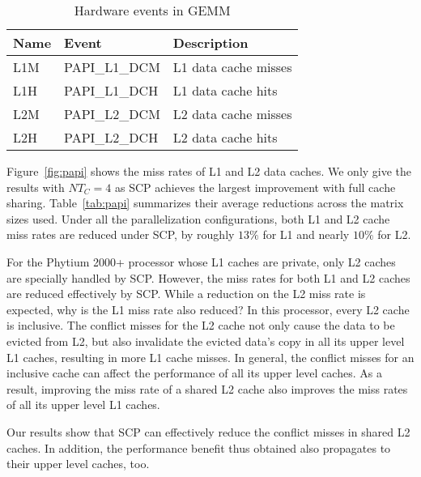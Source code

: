 \begin{table}
  \centering
  \caption{Hardware events in GEMM}
  \label{tab:events}
  \begin{tabular}{lll}
    \toprule
    Name & Event & Description \\
    \midrule
    L1M & PAPI\_L1\_DCM & L1 data cache misses \\
    L1H & PAPI\_L1\_DCH & L1 data cache hits \\
    L2M & PAPI\_L2\_DCM & L2 data cache misses \\
    L2H & PAPI\_L2\_DCH & L2 data cache hits \\
    \bottomrule
  \end{tabular}
\end{table}

Figure~\ref{fig:papi} shows the miss rates of L1 and L2 data caches.
We only give the results with $NT_C=4$
as SCP achieves the largest improvement with full cache sharing.
Table~\ref{tab:papi} summarizes their
average reductions across the matrix sizes used.
Under all the parallelization configurations,
both L1 and L2 cache miss rates are reduced under SCP, 
by roughly $13\%$ for L1 and nearly $10\%$ for L2.

For the Phytium 2000+ processor whose L1 caches are private,
only L2 caches are specially handled by SCP.
However,
the miss rates for both L1 and L2 caches
are reduced effectively by SCP.
While a reduction on the L2 miss rate is expected,
why is the L1 miss rate also reduced? In this processor,
every L2 cache is inclusive.
The conflict misses for the L2 cache not only cause
the data to be evicted from L2,
but also invalidate the evicted data's copy in all its
upper level L1 caches,
resulting in more L1 cache misses.
In general, the conflict misses for
an inclusive cache can affect
the performance of all its upper level caches.
As a result, improving the miss rate of a shared L2 cache
also improves the miss rates of all its upper level L1 caches.

Our results show that SCP can effectively
reduce the conflict misses in shared L2 caches.
In addition, the performance benefit thus obtained
also propagates to their upper level caches, too.

